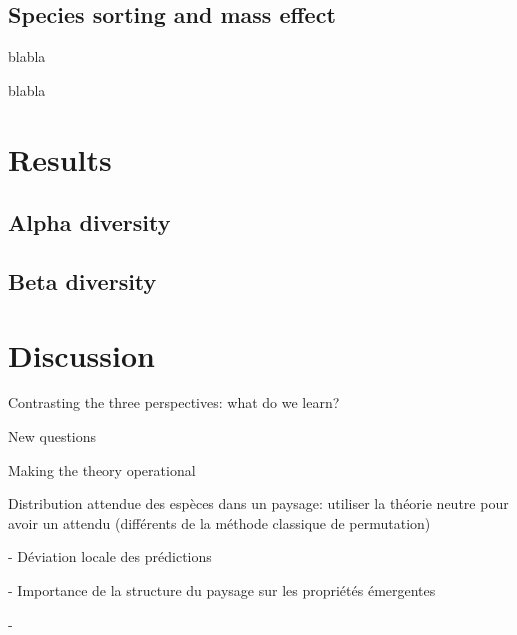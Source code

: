 \documentclass[letterpaper,twocolumn,showkeys]{revtex4-1}
\begin{document}
\subsection{Species sorting and mass effect}
blabla

blabla

\section{Results}

\subsection{Alpha diversity}

\subsection{Beta diversity} 




\section{Discussion}

Contrasting the three perspectives: what do we learn?

New questions

Making the theory operational

Distribution attendue des espèces dans un paysage: utiliser la théorie neutre pour avoir un attendu (différents de la méthode classique de permutation)

- Déviation locale des prédictions

- Importance de la structure du paysage sur les propriétés émergentes

- 



\end{document}
